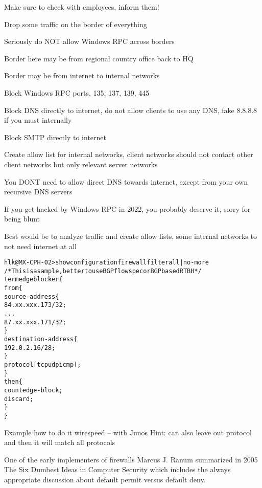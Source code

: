 \documentclass[Screen16to9,17pt]{foils}
\begin{document}
Make sure to check with employees, inform them!


\begin{list2}
\item Drop some traffic on the border of everything
\item Seriously do NOT allow Windows RPC across borders
\item Border here may be from regional country office back to HQ
\item Border may be from internet to internal networks
\item Block Windows RPC ports, 135, 137, 139, 445
\item Block DNS directly to internet, do not allow clients to use any DNS, fake 8.8.8.8 if you must internally
\item Block SMTP directly to internet
\item Create allow list for internal networks, client networks should not contact other client networks but only relevant server networks
\end{list2}

You DONT need to allow direct DNS towards internet, except from your own recursive DNS servers

If you get hacked by Windows RPC in 2022, you probably deserve it, sorry for being blunt

Best would be to analyze traffic and create allow lists, some internal networks to not need internet at all




\begin{alltt}\footnotesize
hlk@MX-CPH-02> show configuration firewall filter all | no-more
/* This is a sample, better to use BGP flowspec or BGP based RTBH */
term edgeblocker \{
    from \{
        source-address \{
            84.xx.xxx.173/32;
...
            87.xx.xxx.171/32;
        \}
        destination-address \{
            192.0.2.16/28;
        \}
        protocol [ tcp udp icmp ];
    \}
    then \{
        count edge-block;
        discard;
    \}
\}
\end{alltt}{\footnotesize
Example how to do it wirespeed -- with Junos
Hint: can also leave out protocol and then it will match all protocols}




One of the early implementers of firewalls Marcus J. Ranum summarized in 2005 The Six Dumbest Ideas in Computer Security  which includes the always appropriate discussion about default permit versus default deny.
\end{document}
